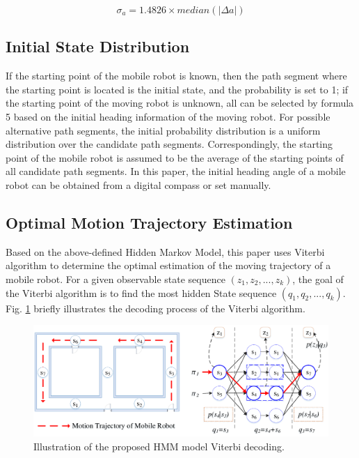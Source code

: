 \documentclass{llncs}
\begin{document}
\begin{equation}
	{\sigma _a} = 1.4826 \times median(\left| {\Delta a} \right|)
\end{equation}

\subsection{Initial State Distribution}

If the starting point of the mobile robot is known, then the path segment where the starting point is located is the initial state, and the probability is set to 1; if the starting point of the moving robot is unknown, all can be selected by formula 5 based on the initial heading information of the moving robot. For possible alternative path segments, the initial probability distribution is a uniform distribution over the candidate path segments. Correspondingly, the starting point of the mobile robot is assumed to be the average of the starting points of all candidate path segments. In this paper, the initial heading angle of a mobile robot can be obtained from a digital compass or set manually.

\subsection{Optimal Motion Trajectory Estimation}

Based on the above-defined Hidden Markov Model, this paper uses Viterbi algorithm to determine the optimal estimation of the moving trajectory of a mobile robot. For a given observable state sequence $({z_1},{z_2},...,{z_k})$, the goal of the Viterbi algorithm is to find the most hidden State sequence $({q_1},{q_2},...,{q_k})$. Fig. \ref{fig-viterbi} briefly illustrates the decoding process of the Viterbi algorithm.

\begin{figure}[!htbp]
	\centering
	\includegraphics[width=4.976in]{RobotMatch-ViterbiDecoding}
	\caption{Illustration of the proposed HMM model Viterbi decoding.}
	\label{fig-viterbi}
\end{figure}
\end{document}
